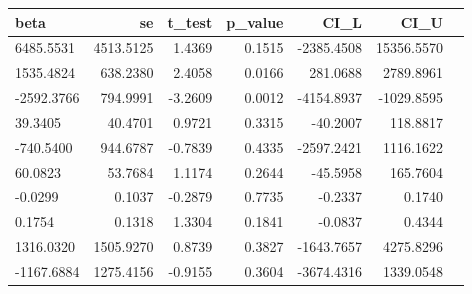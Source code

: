 

\begin{tabular}{lrrrrrr}
	\hline
	 beta & se & t\_test & p\_value & CI\_L & CI\_U \\ 
	\hline
6485.5531 & 4513.5125 & 1.4369 & 0.1515 & -2385.4508 & 15356.5570 \\
1535.4824 & 638.2380 & 2.4058 & 0.0166 & 281.0688 & 2789.8961 \\
-2592.3766 & 794.9991 & -3.2609 & 0.0012 & -4154.8937 & -1029.8595 \\
39.3405 & 40.4701 & 0.9721 & 0.3315 & -40.2007 & 118.8817 \\
-740.5400 & 944.6787 & -0.7839 & 0.4335 & -2597.2421 & 1116.1622 \\
60.0823 & 53.7684 & 1.1174 & 0.2644 & -45.5958 & 165.7604 \\
-0.0299 & 0.1037 & -0.2879 & 0.7735 & -0.2337 & 0.1740 \\
0.1754 & 0.1318 & 1.3304 & 0.1841 & -0.0837 & 0.4344 \\
1316.0320 & 1505.9270 & 0.8739 & 0.3827 & -1643.7657 & 4275.8296 \\
-1167.6884 & 1275.4156 & -0.9155 & 0.3604 & -3674.4316 & 1339.0548 \\

   \hline
\end{tabular}

